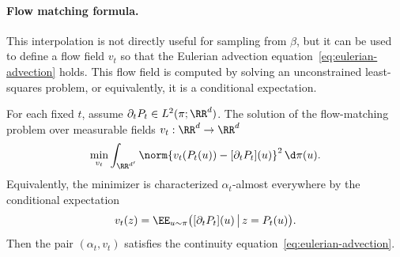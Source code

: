 \paragraph{Flow matching formula.}

This interpolation is not directly useful for sampling from $\beta$, but it can be used to define a flow field $v_t$ so that the Eulerian advection equation~\eqref{eq:eulerian-advection} holds.
%
This flow field is computed by solving an unconstrained least-squares problem, or equivalently, it is a conditional expectation.

\begin{prop}\label{prop-flow-matching-vector-field}
	For each fixed $t$, assume $\partial_tP_t\in L^2(\pi;\RR^d)$. The solution of the flow-matching problem over measurable fields $v_t:\RR^d\to\RR^d$
	\begin{equation}
		\min_{v_t} \int_{\RR^{d'}} \norm{v_t(P_t(u)) - [\partial_t P_t](u)}^2 \, \d\pi(u). \label{eq:flow-matching}
	\end{equation}
	Equivalently, the minimizer is characterized $\alpha_t$-almost everywhere by the conditional expectation
	\begin{equation}\label{eq:flow-match-conditional}
		v_t(z) = \EE_{u \sim \pi} \big( [\partial_t P_t](u) \, \big| \, z = P_t(u) \big).
	\end{equation}
	Then the pair $(\alpha_t,v_t)$ satisfies the continuity equation~\eqref{eq:eulerian-advection}.
\end{prop}

